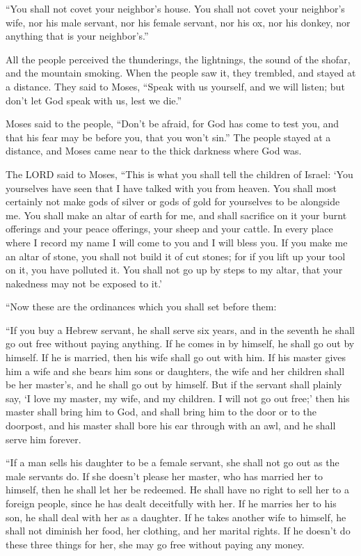 \myverse{}“You shall not covet your neighbor’s house. You shall not covet
your neighbor’s wife, nor his male servant, nor his female servant, nor his ox, nor his donkey, nor anything
that is your neighbor’s.”


\myverse{}All the people perceived the thunderings, the lightnings, the
sound of the shofar, and the mountain smoking. When the people saw it, they trembled, and stayed at a
distance.
\myverse{}They said to Moses, “Speak with us yourself, and we will listen; but don’t
let God speak with us, lest we die.”


\myverse{}Moses said to the people, “Don’t be afraid, for God has come
to test you, and that his fear may be before you, that you won’t sin.”
\myverse{}The people stayed at a distance, and Moses came near to the thick darkness
where God was.


\myverse{}The LORD said to Moses, “This is what you shall tell the children
of Israel: ‘You yourselves have seen that I have talked with you from heaven.
\myverse{}You shall most certainly not make gods of silver or gods of gold for yourselves
to be alongside me.
\myverse{}You shall make an altar of earth for me, and shall sacrifice on it your burnt
offerings and your peace offerings, your sheep and your cattle. In every place where I record my name
I will come to you and I will bless you.
\myverse{}If you make me an altar of stone, you shall not build it of cut stones; for
if you lift up your tool on it, you have polluted it.
\myverse{}You shall not go up by steps to my altar, that your nakedness may not be
exposed to it.’


\mychapter{} \myverse*{}“Now these are the ordinances which you shall set before them:


\quad \myverse{}“If you buy a Hebrew servant, he shall serve six years, and in
the seventh he shall go out free without paying anything.
\myverse{}If he comes in by himself, he shall go out by himself. If he is married, then
his wife shall go out with him.
\myverse{}If his master gives him a wife and she bears him sons or daughters, the wife
and her children shall be her master’s, and he shall go out by himself.
\myverse{}But if the servant shall plainly say, ‘I love my master, my wife, and my children.
I will not go out free;’
\myverse{}then his master shall bring him to God, and shall bring him to the door or
to the doorpost, and his master shall bore his ear through with an awl, and he shall serve him forever.


\myverse{}“If a man sells his daughter to be a female servant, she shall
not go out as the male servants do.
\myverse{}If she doesn’t please her master, who has married her to himself, then he shall
let her be redeemed. He shall have no right to sell her to a foreign people, since he has dealt deceitfully
with her.
\myverse{}If he marries her to his son, he shall deal with her as a daughter.
\myverse{}If he takes another wife to himself, he shall not diminish her food, her
clothing, and her marital rights.
\myverse{}If he doesn’t do these three things for her, she may go free without paying
any money.


